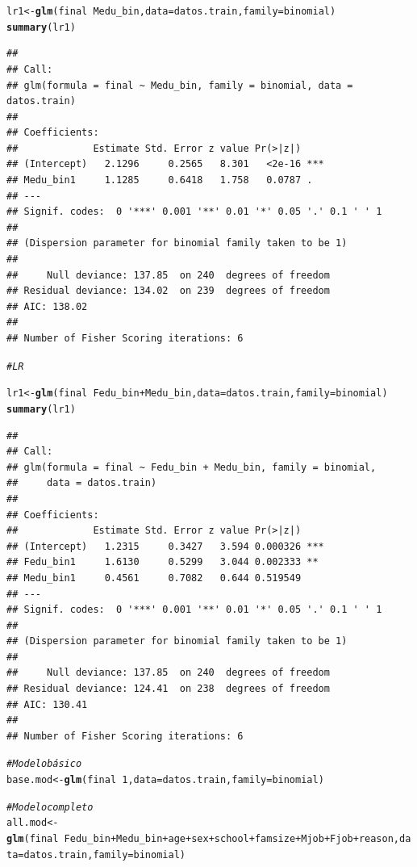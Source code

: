 \documentclass{article}\usepackage[]{graphicx}\usepackage[]{xcolor}
\makeatletter
\newcommand{\hlnum}[1]{\textcolor[rgb]{0.686,0.059,0.569}{#1}}%
\newcommand{\hlcom}[1]{\textcolor[rgb]{0.678,0.584,0.686}{\textit{#1}}}%
\newcommand{\hlopt}[1]{\textcolor[rgb]{0,0,0}{#1}}%
\newcommand{\hlstd}[1]{\textcolor[rgb]{0.345,0.345,0.345}{#1}}%
\newcommand{\hlkwb}[1]{\textcolor[rgb]{0.69,0.353,0.396}{#1}}%
\newcommand{\hlkwc}[1]{\textcolor[rgb]{0.333,0.667,0.333}{#1}}%
\newcommand{\hlkwd}[1]{\textcolor[rgb]{0.737,0.353,0.396}{\textbf{#1}}}%
\newenvironment{kframe}{%
 \def\at@end@of@kframe{}%
 \ifinner\ifhmode%
  \def\at@end@of@kframe{\end{minipage}}%
  \begin{minipage}{\columnwidth}%
 \fi\fi%
 \def\FrameCommand##1{\hskip\@totalleftmargin \hskip-\fboxsep
 \colorbox{shadecolor}{##1}\hskip-\fboxsep
     \hskip-\linewidth \hskip-\@totalleftmargin \hskip\columnwidth}%
 \MakeFramed {\advance\hsize-\width
   \@totalleftmargin\z@ \linewidth\hsize
   \@setminipage}}%
 {\par\unskip\endMakeFramed%
 \at@end@of@kframe}
\newenvironment{knitrout}{}{} %
\makeatother
\begin{document}
\begin{knitrout}
\begin{kframe}
\begin{alltt}
\hlstd{lr1} \hlkwb{<-} \hlkwd{glm}\hlstd{(final} \hlopt{~} \hlstd{Medu_bin ,} \hlkwc{data}\hlstd{= datos.train,}\hlkwc{family}\hlstd{=binomial)}
\hlkwd{summary}\hlstd{(lr1)}
\end{alltt}
\begin{verbatim}
## 
## Call:
## glm(formula = final ~ Medu_bin, family = binomial, data = datos.train)
## 
## Coefficients:
##             Estimate Std. Error z value Pr(>|z|)    
## (Intercept)   2.1296     0.2565   8.301   <2e-16 ***
## Medu_bin1     1.1285     0.6418   1.758   0.0787 .  
## ---
## Signif. codes:  0 '***' 0.001 '**' 0.01 '*' 0.05 '.' 0.1 ' ' 1
## 
## (Dispersion parameter for binomial family taken to be 1)
## 
##     Null deviance: 137.85  on 240  degrees of freedom
## Residual deviance: 134.02  on 239  degrees of freedom
## AIC: 138.02
## 
## Number of Fisher Scoring iterations: 6
\end{verbatim}
\begin{alltt}
\hlcom{# LR}

\hlstd{lr1} \hlkwb{<-} \hlkwd{glm}\hlstd{(final} \hlopt{~} \hlstd{Fedu_bin}\hlopt{+}\hlstd{Medu_bin,} \hlkwc{data}\hlstd{= datos.train,}\hlkwc{family}\hlstd{=binomial)}
\hlkwd{summary}\hlstd{(lr1)}
\end{alltt}
\begin{verbatim}
## 
## Call:
## glm(formula = final ~ Fedu_bin + Medu_bin, family = binomial, 
##     data = datos.train)
## 
## Coefficients:
##             Estimate Std. Error z value Pr(>|z|)    
## (Intercept)   1.2315     0.3427   3.594 0.000326 ***
## Fedu_bin1     1.6130     0.5299   3.044 0.002333 ** 
## Medu_bin1     0.4561     0.7082   0.644 0.519549    
## ---
## Signif. codes:  0 '***' 0.001 '**' 0.01 '*' 0.05 '.' 0.1 ' ' 1
## 
## (Dispersion parameter for binomial family taken to be 1)
## 
##     Null deviance: 137.85  on 240  degrees of freedom
## Residual deviance: 124.41  on 238  degrees of freedom
## AIC: 130.41
## 
## Number of Fisher Scoring iterations: 6
\end{verbatim}
\begin{alltt}
\hlcom{# Modelo básico}
\hlstd{base.mod} \hlkwb{<-} \hlkwd{glm}\hlstd{(final} \hlopt{~} \hlnum{1} \hlstd{,} \hlkwc{data}\hlstd{= datos.train,}\hlkwc{family}\hlstd{=binomial)}

\hlcom{# Modelo completo}
\hlstd{all.mod} \hlkwb{<-} \hlkwd{glm}\hlstd{(final} \hlopt{~} \hlstd{Fedu_bin}\hlopt{+}\hlstd{Medu_bin}\hlopt{+}\hlstd{age}\hlopt{+}\hlstd{sex}\hlopt{+}\hlstd{school}\hlopt{+}\hlstd{famsize}\hlopt{+}\hlstd{Mjob}\hlopt{+}\hlstd{Fjob}\hlopt{+}\hlstd{reason ,} \hlkwc{data}\hlstd{= datos.train,}\hlkwc{family}\hlstd{=binomial)}


\end{alltt}
\end{kframe}
\end{knitrout}
\end{document}

